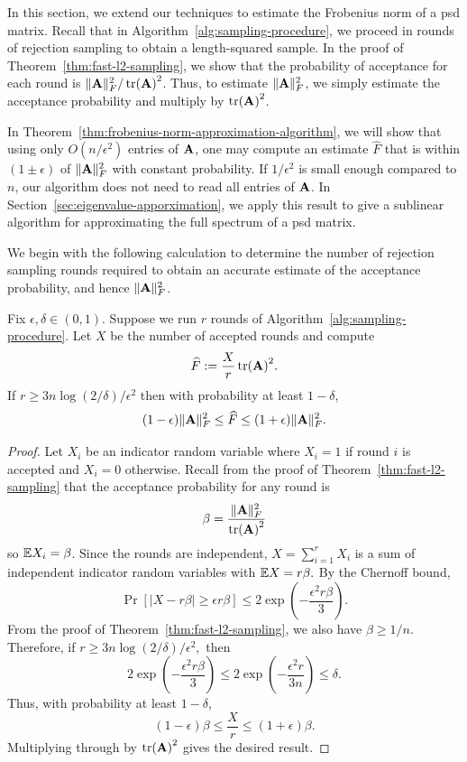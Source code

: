 In this section, we extend our techniques to estimate the Frobenius norm of a psd matrix. Recall that in Algorithm~\ref{alg:sampling-procedure}, we proceed in rounds of rejection sampling to obtain a length-squared sample. In the proof of Theorem~\ref{thm:fast-l2-sampling}, we show that the probability of acceptance for each round is $\|\mathbf{A}\|^2_F/\tr(\mathbf{A})^2$. Thus, to estimate $\|\mathbf{A}\|^2_F$, we simply estimate the acceptance probability and multiply by $\tr(\mathbf{A})^2$. 

In Theorem~\ref{thm:frobenius-norm-approximation-algorithm}, we will show that using only $O(n/\epsilon^2)$ entries of $\mathbf{A}$, one may compute an estimate $\widehat F$ that is within $(1\pm \epsilon)$ of $\|\mathbf{A}\|^2_F$ with constant probability. If $1/\epsilon^2$ is small enough compared to $n$, our algorithm does not need to read all entries of $\mathbf{A}$. In Section~\ref{sec:eigenvalue-apporximation}, we apply this result to give a sublinear algorithm for approximating the full spectrum of a psd matrix.

We begin with the following calculation to determine the number of rejection sampling rounds required to obtain an accurate estimate of the acceptance probability, and hence $\|\mathbf{A}\|^2_F$.

\begin{lemma}
\label{lem:frobenius-norm-approximation}
    Fix $\epsilon,\delta\in(0, 1)$. Suppose we run $r$ rounds of Algorithm~\ref{alg:sampling-procedure}. Let $X$ be the number of accepted rounds and compute 
    \[\widehat F := \frac{X}{r}\tr(\mathbf{A})^2.\]
    If $r\geq 3n\log(2/\delta)/\epsilon^2$ then with probability at least $1-\delta$,
    \[(1-\epsilon)\|\mathbf{A}\|^2_F\leq \widehat F\leq(1+\epsilon)\|\mathbf{A}\|^2_F.\]
\end{lemma}

\begin{proof}
    Let $X_i$ be an indicator random variable where $X_i = 1$ if round $i$ is accepted and $X_i=0$ otherwise. Recall from the proof of Theorem~\ref{thm:fast-l2-sampling} that the acceptance probability for any round is
    \[\beta = \frac{\|\mathbf{A}\|^2_F}{\tr(\mathbf{A})^2}\]
    so $\mathbb{E} X_i = \beta$. Since the rounds are independent,
    \(
        X=\sum_{i=1}^r X_i
    \)
    is a sum of independent indicator random variables with $\mathbb{E} X = r\beta.$
    By the Chernoff bound,
    \[
        \Pr\left[|X-r\beta|\geq \epsilon r\beta\right]
        \leq 2\exp\left(-\frac{\epsilon^2 r\beta}{3}\right).
    \]
    From the proof of Theorem~\ref{thm:fast-l2-sampling}, we also have
    $\beta\geq 1/n$. Therefore, if
    \(
        r\geq {3n\log(2/\delta)}/{\epsilon^2},
    \)
    then
    \[
        2\exp\left(-\frac{\epsilon^2 r\beta}{3}\right)
        \leq
        2\exp\left(-\frac{\epsilon^2 r}{3n}\right)
        \leq \delta.
    \]
    Thus, with probability at least $1-\delta$,
    \[
        (1-\epsilon)\beta
        \leq
        \frac{X}{r}
        \leq
        (1+\epsilon)\beta.
    \]
    Multiplying through by $\tr(\mathbf{A})^2$ gives the desired result.
\end{proof}

